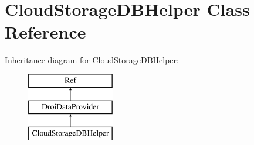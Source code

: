 \hypertarget{class_cloud_storage_d_b_helper}{}\section{Cloud\+Storage\+D\+B\+Helper Class Reference}
\label{class_cloud_storage_d_b_helper}
Inheritance diagram for Cloud\+Storage\+D\+B\+Helper\+:\begin{figure}[H]
\begin{center}
\leavevmode
\includegraphics[height=3.000000cm]{d0/dae/class_cloud_storage_d_b_helper}
\end{center}
\end{figure}
